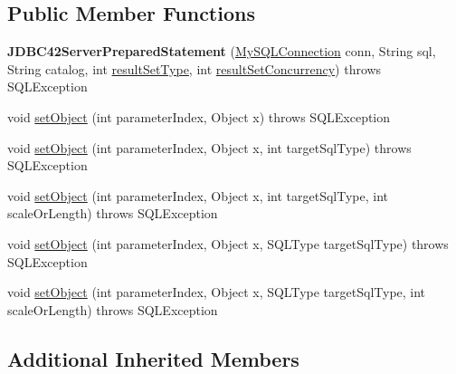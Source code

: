 \subsection*{Public Member Functions}
\begin{DoxyCompactItemize}
\item 
\mbox{\label{classcom_1_1mysql_1_1jdbc_1_1_j_d_b_c42_server_prepared_statement_af75dd07aa0de5532646db68b6e14f896}} 
{\bfseries J\+D\+B\+C42\+Server\+Prepared\+Statement} (\mbox{\hyperlink{interfacecom_1_1mysql_1_1jdbc_1_1_my_s_q_l_connection}{My\+S\+Q\+L\+Connection}} conn, String sql, String catalog, int \mbox{\hyperlink{classcom_1_1mysql_1_1jdbc_1_1_statement_impl_a9c4013da0e1b73577723769660e4ff25}{result\+Set\+Type}}, int \mbox{\hyperlink{classcom_1_1mysql_1_1jdbc_1_1_statement_impl_aca243fcfce2d3a1be8a97d643b83ddc3}{result\+Set\+Concurrency}})  throws S\+Q\+L\+Exception 
\item 
void \mbox{\hyperlink{classcom_1_1mysql_1_1jdbc_1_1_j_d_b_c42_server_prepared_statement_a9a83cc7e397a4e829033b7581ce85988}{set\+Object}} (int parameter\+Index, Object x)  throws S\+Q\+L\+Exception 
\item 
void \mbox{\hyperlink{classcom_1_1mysql_1_1jdbc_1_1_j_d_b_c42_server_prepared_statement_a9a06206227a74ff39ce614c50ddf7580}{set\+Object}} (int parameter\+Index, Object x, int target\+Sql\+Type)  throws S\+Q\+L\+Exception 
\item 
void \mbox{\hyperlink{classcom_1_1mysql_1_1jdbc_1_1_j_d_b_c42_server_prepared_statement_a115f0ae4b89dcfdd05b38302f6cd11d0}{set\+Object}} (int parameter\+Index, Object x, int target\+Sql\+Type, int scale\+Or\+Length)  throws S\+Q\+L\+Exception 
\item 
void \mbox{\hyperlink{classcom_1_1mysql_1_1jdbc_1_1_j_d_b_c42_server_prepared_statement_a79d40656063b810e0dd045e98d47b70d}{set\+Object}} (int parameter\+Index, Object x, S\+Q\+L\+Type target\+Sql\+Type)  throws S\+Q\+L\+Exception 
\item 
void \mbox{\hyperlink{classcom_1_1mysql_1_1jdbc_1_1_j_d_b_c42_server_prepared_statement_a251948a777358bd80d8756b60b3c008a}{set\+Object}} (int parameter\+Index, Object x, S\+Q\+L\+Type target\+Sql\+Type, int scale\+Or\+Length)  throws S\+Q\+L\+Exception 
\end{DoxyCompactItemize}
\subsection*{Additional Inherited Members}


